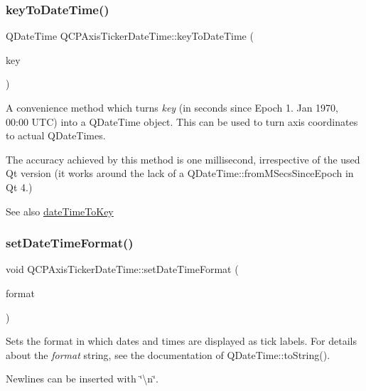 \subsubsection{\texorpdfstring{key\+To\+Date\+Time()}{keyToDateTime()}}
{\footnotesize\ttfamily Q\+Date\+Time Q\+C\+P\+Axis\+Ticker\+Date\+Time\+::key\+To\+Date\+Time (\begin{DoxyParamCaption}\item[{double}]{key }\end{DoxyParamCaption})\hspace{0.3cm}{\ttfamily [static]}}

A convenience method which turns {\itshape key} (in seconds since Epoch 1. Jan 1970, 00\+:00 U\+TC) into a Q\+Date\+Time object. This can be used to turn axis coordinates to actual Q\+Date\+Times.

The accuracy achieved by this method is one millisecond, irrespective of the used Qt version (it works around the lack of a Q\+Date\+Time\+::from\+M\+Secs\+Since\+Epoch in Qt 4.)

\begin{DoxySeeAlso}{See also}
\hyperlink{class_q_c_p_axis_ticker_date_time_aa24f293f16fff0f937bf71f4140033f1}{date\+Time\+To\+Key} 
\end{DoxySeeAlso}
\mbox{\label{class_q_c_p_axis_ticker_date_time_ad52660a82f688395468674d555f6a86b}} 
\subsubsection{\texorpdfstring{set\+Date\+Time\+Format()}{setDateTimeFormat()}}
{\footnotesize\ttfamily void Q\+C\+P\+Axis\+Ticker\+Date\+Time\+::set\+Date\+Time\+Format (\begin{DoxyParamCaption}\item[{const Q\+String \&}]{format }\end{DoxyParamCaption})}

Sets the format in which dates and times are displayed as tick labels. For details about the {\itshape format} string, see the documentation of Q\+Date\+Time\+::to\+String().

Newlines can be inserted with \char`\"{}\textbackslash{}n\char`\"{}.

